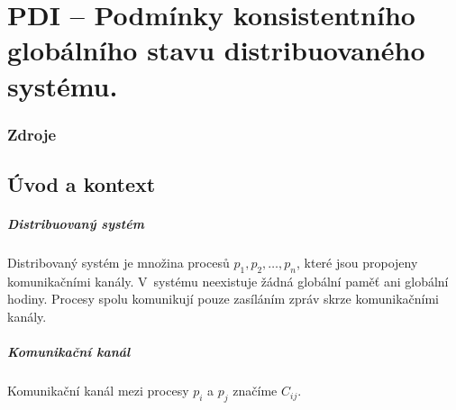 

\graphicspath{{pdi/konzistentni_globalni_stav/figures}}


\chapter{PDI -- Podmínky konsistentního globálního stavu distribuovaného systému.}



\subsection{Zdroje}

\begin{compactitem}
    \item {}
    \item {}
\end{compactitem}


\section{Úvod a kontext}

\paragraph*{Distribuovaný systém} Distribovaný systém je množina procesů $p_1, p_2, \dots, p_n$, které jsou propojeny komunikačními kanály. V~systému neexistuje žádná globální paměť ani globální hodiny. Procesy spolu komunikují pouze zasíláním zpráv skrze komunikačními kanály.

\paragraph*{Komunikační kanál} Komunikační kanál mezi procesy $p_i$ a $p_j$ značíme $C_{ij}$.

